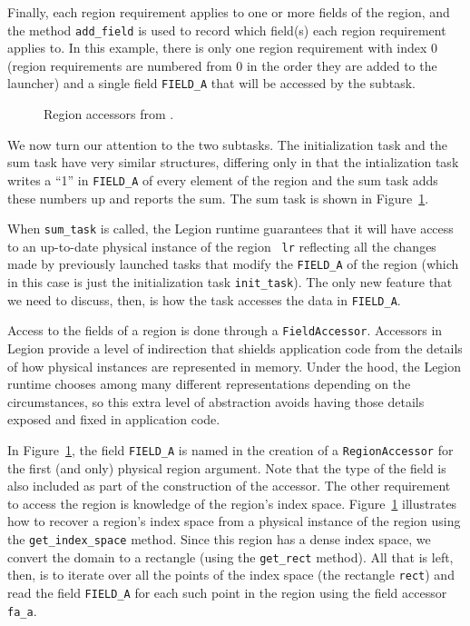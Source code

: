 Finally, each region requirement applies to one or more fields of the region, and the method {\tt add\_field} is
used to record which field(s) each region requirement applies to.
In this example, there is only one region requirement with index 0 (region requirements
are numbered from 0 in the order they are added to the launcher) and a single field {\tt FIELD\_A} that will be
accessed by the subtask.

\begin{figure}
  
\caption{Region accessors from .}
\label{fig:accessors}
\end{figure}
We now turn our attention to the two subtasks.  The initialization task and the sum task have very similar
structures, differing only in that the intialization task writes a ``1'' in {\tt FIELD\_A} of every element of the region and
the sum task adds these numbers up and reports the sum.  The sum task is shown in Figure~\ref{fig:accessors}.

When {\tt sum\_task} is called, the Legion runtime guarantees that it
will have access to an up-to-date physical instance of the region {\tt
  lr} reflecting all the changes made by previously launched tasks
that modify the {\tt FIELD\_A} of the region (which in this case is
just the initialization task {\tt init\_task}).  The only new feature
that we need to discuss, then, is how the task accesses the data in {\tt FIELD\_A}.

Access to the fields of a region is done through a {\tt FieldAccessor}.  Accessors in Legion provide a level of indirection
that shields application code from the details of how physical instances  are represented in memory.  Under the hood, 
the Legion runtime chooses among many different representations depending on the circumstances, so this extra level
of abstraction avoids having those details exposed and fixed in application code.

In Figure~\ref{fig:accessors}, the field
{\tt FIELD\_A} is named in the creation of a {\tt RegionAccessor} for the first (and only) physical region argument.
Note that the type of the field is also included as part of the construction of the accessor.
The other requirement to access the region is knowledge of the region's index space.  Figure~\ref{fig:accessors}
illustrates how to recover a region's index space from a physical instance of the region using the {\tt get\_index\_space} method.
Since this region has a dense index space, we convert the domain to a rectangle (using the {\tt get\_rect} method).
All that is left, then, is to iterate over all the points of the index space (the rectangle {\tt rect}) and read the
field {\tt FIELD\_A} for each such point in the region using the field accessor {\tt fa\_a}.

